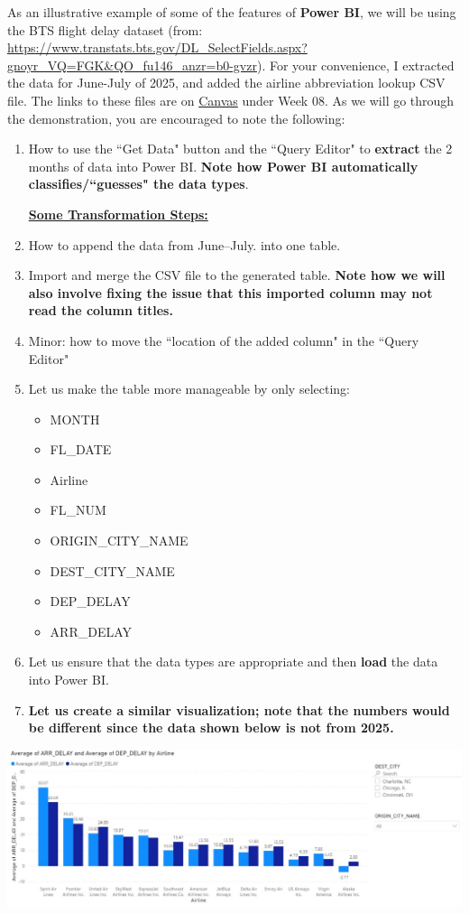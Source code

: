 \documentclass[letterpaper,addpoints, 11pt]{exam}
\begin{document}
\begin{questions}
\question[0] As an illustrative example of some of the features of \textbf{Power BI}, we will be using the BTS flight delay dataset (from: \url{https://www.transtats.bts.gov/DL_SelectFields.aspx?gnoyr_VQ=FGK&QO_fu146_anzr=b0-gvzr}). For your convenience, I extracted the data for June-July of 2025, and  added the airline abbreviation lookup CSV file. The links to these files are on \underline{Canvas} under Week 08. As we will go through the demonstration, you are encouraged to note the following: 
\begin{enumerate}[label=(\Alph*)]
	\item How to use the ``Get Data" button and the ``Query Editor" to \textbf{extract} the 2 months of data into Power BI. \textbf{Note how Power BI automatically classifies/``guesses" the data types}.\\
	\bigskip \bigskip \bigskip \bigskip
	
	\noindent \underline{\textbf{Some Transformation Steps:}}
	\item How to append the data from June--July. into one table.
	\bigskip \bigskip \bigskip  
	\item Import and merge the CSV file to the generated table. \textbf{Note how we will also involve fixing the issue that this imported column may not read the column titles.}
	\bigskip \bigskip
	\item Minor: how to move the ``location of the added column" in the ``Query Editor"
	\bigskip
	\item Let us make the table more manageable by only selecting: 
	\begin{itemize}[nosep]
		\item MONTH
		\item FL\_DATE
		\item Airline %
		\item FL\_NUM %
		\item ORIGIN\_CITY\_NAME %
		\item DEST\_CITY\_NAME %
		\item DEP\_DELAY 
		\item ARR\_DELAY
	\end{itemize}
	\item Let us ensure that the data types are appropriate and then \textbf{load} the data into Power BI.
	\bigskip \bigskip
	\item \textbf{Let us create a similar visualization; note that the numbers would be different since the data shown below is not from 2025.}	
\end{enumerate}
 	
{\centering \includegraphics[width=\textwidth,frame]{../../figures/powerbi}}

\end{questions}
\end{document}
